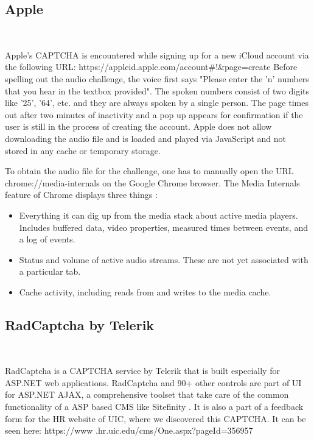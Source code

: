 \subsection{Apple} \mbox{} \	

Apple's CAPTCHA is encountered while signing up for a new iCloud account via the following URL: https://appleid.\newline apple.com/account\#!\&page=create Before spelling out the audio challenge, the voice first says "Please enter the 'n' numbers that you hear in the textbox provided". The spoken numbers consist of two digits like '25', '64', etc. and they are always spoken by a single person. The page times out after two minutes of inactivity and a pop up appears for confirmation if the user is still in the process of creating the account. Apple does not allow downloading the audio file and is loaded and played via JavaScript and not stored in any cache or temporary storage. \newline

To obtain the audio file for the challenge, one has to manually open the URL chrome://media-internals on the Google Chrome browser. The Media Internals feature of Chrome displays three things \cite{media}:
\begin{itemize}
\item Everything it can dig up from the media stack about active media players. Includes buffered data, video properties, measured times between events, and a log of events.
\item Status and volume of active audio streams. These are not yet associated with a particular tab.
\item Cache activity, including reads from and writes to the media cache.\newline
\end{itemize}

\subsection{RadCaptcha by Telerik} \mbox{} \	

RadCaptcha is a CAPTCHA service by Telerik that is built especially for ASP.NET web applications. RadCaptcha and 90+ other controls are part of UI for ASP.NET AJAX, a comprehensive toolset that take care of the common functionality of a ASP based CMS like Sitefinity \cite{radcaptcha}. It is also a part of a feedback form for the HR website of UIC, where we discovered this CAPTCHA. It can be seen here: https://www
.hr.uic.edu/cms/One.aspx?pageId=356957\newline

